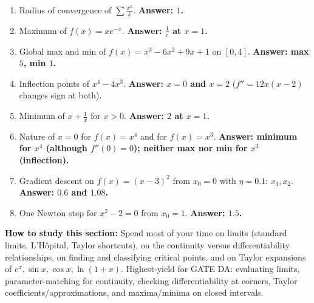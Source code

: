 \documentclass[11pt,a4paper]{article}
\begin{document}
\begin{enumerate}[leftmargin=*,itemsep=4pt]
\item Radius of convergence of $\sum\frac{x^k}{k}$. \textbf{Answer: $1$.}
\item Maximum of $f(x)=x e^{-x}$. \textbf{Answer: $\frac1e$ at $x=1$.}
\item Global max and min of $f(x)=x^3-6x^2+9x+1$ on $[0,4]$. \textbf{Answer: max $5$, min $1$.}
\item Inflection points of $x^4-4x^3$. \textbf{Answer: $x=0$ and $x=2$} ($f''=12x(x-2)$ changes sign at both).
\item Minimum of $x+\frac1x$ for $x>0$. \textbf{Answer: $2$ at $x=1$.}
\item Nature of $x=0$ for $f(x)=x^4$ and for $f(x)=x^3$. \textbf{Answer: minimum for $x^4$ (although $f''(0)=0$); neither max nor min for $x^3$ (inflection).}
\item Gradient descent on $f(x)=(x-3)^2$ from $x_0=0$ with $\eta=0.1$: $x_1,x_2$. \textbf{Answer: $0.6$ and $1.08$.}
\item One Newton step for $x^2-2=0$ from $x_0=1$. \textbf{Answer: $1.5$.}
\end{enumerate}

\textbf{How to study this section:} Spend most of your time on limits (standard limits, L'H\^opital, Taylor shortcuts), on the continuity versus differentiability relationships, on finding and classifying critical points, and on Taylor expansions of $e^x,\sin x,\cos x,\ln(1+x)$. Highest-yield for GATE DA: evaluating limits, parameter-matching for continuity, checking differentiability at corners, Taylor coefficients/approximations, and maxima/minima on closed intervals.
\end{document}
